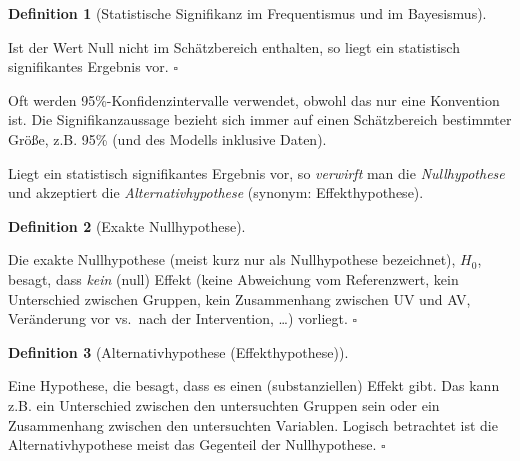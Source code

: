 \documentclass[
  ngerman,
  letterpaper,
  twoside,
  open=any]{scrbook}
\theoremstyle{definition}
\theoremstyle{plain}
\theoremstyle{definition}
\theoremstyle{definition}
\newtheorem{definition}{Definition}[chapter]
\theoremstyle{remark}
\begin{document}
\begin{definition}[Statistische Signifikanz im Frequentismus und im
Bayesismus]\protect\hypertarget{def-signifikanz}{}\label{def-signifikanz}

Ist der Wert Null nicht im Schätzbereich enthalten, so liegt ein
statistisch signifikantes Ergebnis vor. \(\square\)

\end{definition}

Oft werden 95\%-Konfidenzintervalle verwendet, obwohl das nur eine
Konvention ist. Die Signifikanzaussage bezieht sich immer auf einen
Schätzbereich bestimmter Größe, z.B. 95\% (und des Modells inklusive
Daten).

Liegt ein statistisch signifikantes Ergebnis vor, so \emph{verwirft} man
die \emph{Nullhypothese} und akzeptiert die \emph{Alternativhypothese}
(synonym: Effekthypothese).

\begin{definition}[Exakte
Nullhypothese]\protect\hypertarget{def-nullhyp}{}\label{def-nullhyp}

Die exakte Nullhypothese (meist kurz nur als Nullhypothese bezeichnet),
\(H_0\), besagt, dass \emph{kein} (null) Effekt (keine Abweichung vom
Referenzwert, kein Unterschied zwischen Gruppen, kein Zusammenhang
zwischen UV und AV, Veränderung vor vs.~nach der Intervention, \ldots)
vorliegt. \(\square\)

\end{definition}

\begin{definition}[Alternativhypothese
(Effekthypothese)]\protect\hypertarget{def-alternativhyp}{}\label{def-alternativhyp}

Eine Hypothese, die besagt, dass es einen (substanziellen) Effekt gibt.
Das kann z.B. ein Unterschied zwischen den untersuchten Gruppen sein
oder ein Zusammenhang zwischen den untersuchten Variablen. Logisch
betrachtet ist die Alternativhypothese meist das Gegenteil der
Nullhypothese. \(\square\)

\end{definition}
\end{document}
